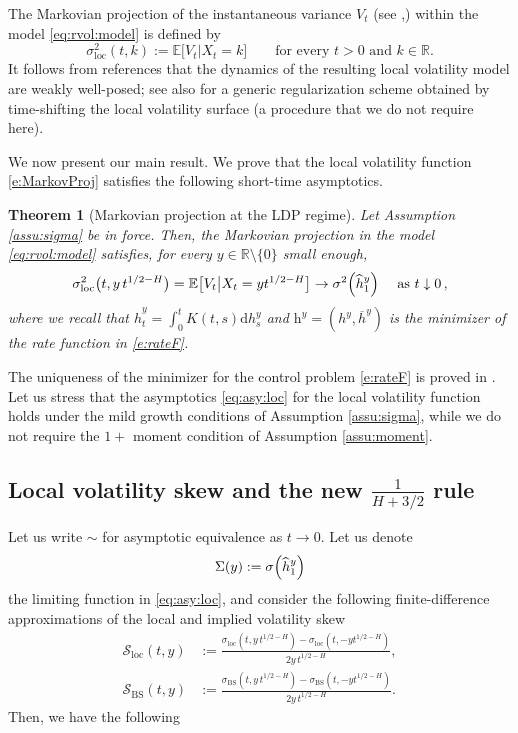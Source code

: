 \documentclass[11pt]{article}
\theoremstyle{plain}
\newtheorem{theorem}{Theorem}[section]
\theoremstyle{definition}
\theoremstyle{remark}
\newcommand{\R}{\mathbb{R}}
\newcommand{\be}{\beta}
\renewcommand{\bar}{\overline}
\renewcommand{\hat}{\widehat}
\newcommand{\dd}{\mathrm{d}}
\newcommand{\bE}{\mathbb{E}}
\newcommand{\1}{\mathbf{1}}
\newcommand{\Sbs}{\mathcal{S}_\mathrm{BS}}
\newcommand{\Sloc}{\mathcal{S}_\mathrm{loc}}
\numberwithin{equation}{section}
\def\h{\mathrm h}
\def\maj{>}
\def\be{\begin{equation}}
\def\ee{\end{equation}}
\def\sigDup{\sigma_\mathrm{loc}}
\def\sigBS{\sigma_\mathrm{BS}}
\begin{document}
The Markovian projection of the instantaneous variance $V_t$ 
(see \cite{GyongyMimicking},\cite[Corollary 3.7]{BrunickShreve}) 
within the model \eqref{eq:rvol:model} is defined by
\be 
\label{e:MarkovProj}
\sigDup^2(t, k) :=
\bE \bigl[
V_t |X_t = k
\bigr] 
\qquad \text{for every } t \maj 0 \text{ and } k \in \R.
\ee
It follows from references \cite{GyongyMimicking, BrunickShreve} that the dynamics of the resulting local volatility model are weakly well-posed; see also \cite{friz2014make} for a generic regularization scheme obtained by time-shifting the local volatility surface (a procedure that we do not require here). 

We now present our main result. We prove that the local volatility function \eqref{e:MarkovProj} satisfies the following  short-time asymptotics.

\begin{theorem}[Markovian projection at the LDP regime] \label{th:asymptotic:markovian:projection}
Let Assumption \ref{assu:sigma} be in force.
Then, the Markovian projection in the model  \eqref{eq:rvol:model} satisfies, for every $y\in\R\setminus\{0\}$ small enough,
\begin{equation}\label{eq:asy:loc}
\sigDup^2 \bigl(t, y \, t^{1/2-H} \bigr) =
\mathbb{E}\bigl[\bigl.V_{t}\bigr|X_{t}=yt^{1/2-H}\bigr]
\to \sigma^2 \Bigl(\hat{h}_1^y \Bigr)\quad \mbox{ as } t\downarrow 0 \,,
\end{equation}
where we recall that $\hat h^y_t = \int_0^t K(t,s) \dd h^y_s$ 
and 
$\h^y = (h^y, \bar h^y)$ is the minimizer of the rate function in \eqref{e:rateF}.
\end{theorem}


The uniqueness of the minimizer for the control problem \eqref{e:rateF} is proved in \cite[Lemma C.6]{friz2018precise1}.
Let us stress that the asymptotics \eqref{eq:asy:loc} for the local volatility function holds under 
the mild growth conditions
of Assumption \ref{assu:sigma}, while we do not require the $1+$ moment condition of Assumption \ref{assu:moment}. 

\subsection{Local volatility skew and the new $\frac{1}{H+3/2}$ rule} 
Let us write $\sim$ for asymptotic equivalence as $t\to 0$.  Let us denote
\[
\Sigma(y) := \sigma \Bigl(\hat{h}_1^y \Bigr)
\]
the limiting function in \eqref{eq:asy:loc}, and consider the following finite-difference approximations of the local and
implied volatility skew
\begin{align}\label{eq:locvolskew}
\Sloc(t, y) 
&:=
\frac{
	\sigDup(t, y \, t^{1/2 - H} ) - \sigDup(t, -yt^{1/2 - H})
} {2y \, t^{1/2 - H}},
\\
\Sbs(t, y)
&:=
\frac{
	\sigBS(t, y \, t^{1/2 - H} ) - \sigBS(t, -yt^{1/2 - H})
} {2y \, t^{1/2 - H}}. 
\end{align}
Then, we have the following
\end{document}
